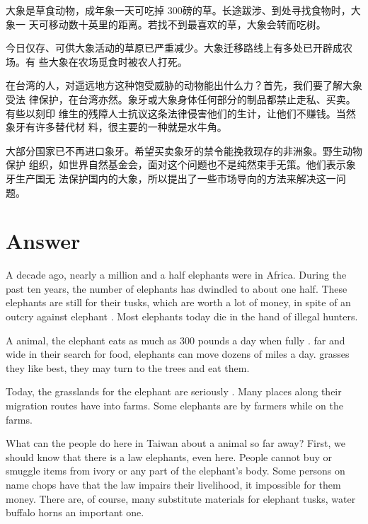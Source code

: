 大象是草食动物，成年象一天可吃掉 300磅的草。长途跋涉、到处寻找食物时，大象一
天可移动数十英里的距离。若找不到最喜欢的草，大象会转而吃树。

今日仅存、可供大象活动的草原已严重减少。大象迁移路线上有多处已开辟成农场。有
些大象在农场觅食时被农人打死。

在台湾的人，对遥远地方这种饱受威胁的动物能出什么力？首先，我们要了解大象受法
律保护，在台湾亦然。象牙或大象身体任何部分的制品都禁止走私、买卖。有些以刻印
维生的残障人士抗议这条法律侵害他们的生计，让他们不赚钱。当然象牙有许多替代材
料，很主要的一种就是水牛角。

大部分国家已不再进口象牙。希望买卖象牙的禁令能挽救现存的非洲象。野生动物保护
组织，如世界自然基金会，面对这个问题也不是纯然束手无策。他们表示象牙生产国无
法保护国内的大象，所以提出了一些市场导向的方法来解决这一问题。

\section{Answer}

A decade ago, nearly a million and a half elephants were  in
Africa. During the past ten years, the number of elephants has dwindled to
about one half. These elephants are still   for
their tusks, which are worth a lot of money, in spite of an
 outcry against elephant . Most elephants
 today die in the hand of illegal hunters.

A  animal, the elephant eats as much as 300 pounds a
day when fully .  far and wide in their search
for food, elephants can move dozens of miles a day.   grasses they like best, they may turn to the trees and eat them.

Today, the  grasslands for the elephant are seriously
. Many places along their migration routes have 
 into farms. Some elephants are  by farmers while
 on the farms.

What can the people do here in Taiwan about a  animal
 so far away? First, we should know that there is a law
 elephants, even here. People cannot buy or smuggle items
 from ivory or any part of the elephant's body. Some
 persons  on  name chops have
  that the law impairs their livelihood, 
it impossible for them  money. There are, of course, many
substitute materials for elephant tusks, water buffalo horns  an
important one.

